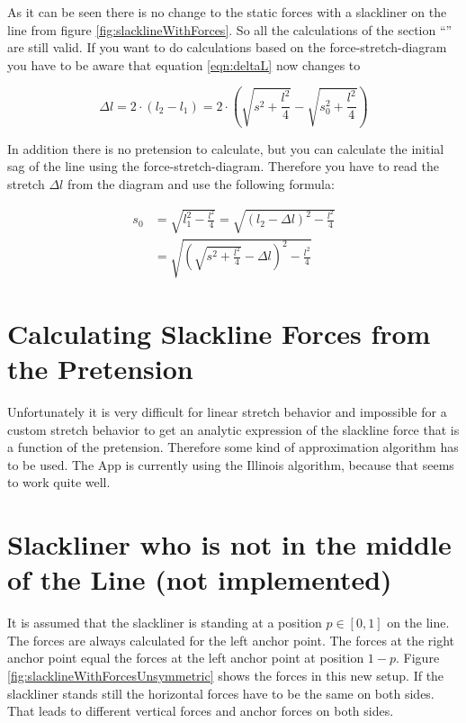 As it can be seen there is no change to the static forces with a slackliner on the line from figure \ref{fig:slacklineWithForces}. So all the calculations of the section ``'' are still valid. If you want to do calculations based on the force-stretch-diagram you have to be aware that equation \ref{eqn:deltaL} now changes to

\begin{equation}
	\Delta l = 2\cdot (l_2 - l_1) = 2\cdot \left( \sqrt{s^2+\frac{l^2}{4}} - \sqrt{s_0^2+\frac{l^2}{4}}\right)
	\label{eqn:deltaLRodeo}
\end{equation}

In addition there is no pretension to calculate, but you can calculate the initial sag of the line using the force-stretch-diagram. Therefore you have to read the stretch $\Delta l$ from the diagram and use the following formula:

\begin{align}
	s_0 &= \sqrt{l_1^2 - \frac{l^2}{4}} = \sqrt{\left(l_2-\Delta l\right)^2 - \frac{l^2}{4}} \\
	&= \sqrt{\left( \sqrt{s^2 + \frac{l^2}{4}}  -\Delta l\right)^2 - \frac{l^2}{4}}
\end{align}

\section{Calculating Slackline Forces from the Pretension}

Unfortunately it is very difficult for linear stretch behavior and impossible for a custom stretch behavior to get an analytic expression of the slackline force that is a function of the pretension. Therefore some kind of approximation algorithm has to be used. The App is currently using the Illinois algorithm, because that seems to work quite well.

\section{Slackliner who is not in the middle of the Line (not implemented)}

It is assumed that the slackliner is standing at a position $p \in [0,1]$ on the line. The forces are always calculated for the left anchor point. The forces at the right anchor point equal the forces at the left anchor point at position $1-p$. Figure \ref{fig:slacklineWithForcesUnsymmetric} shows the forces in this new setup. If the slackliner stands still the horizontal forces have to be the same on both sides. That leads to different vertical forces and anchor forces on both sides.

